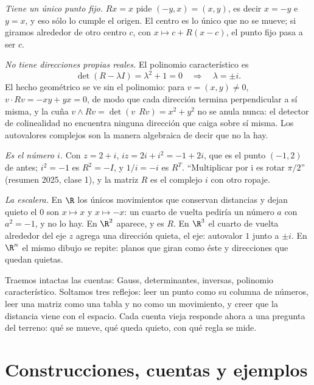 \emph{Tiene un único punto fijo.} \(Rx=x\) pide \((-y,x)=(x,y)\), es decir \(x=-y\) e
\(y=x\), y eso sólo lo cumple el origen. El centro es lo único que no se mueve; si giramos
alrededor de otro centro \(c\), con \(x\mapsto c+R(x-c)\), el punto fijo pasa a ser \(c\).

\emph{No tiene direcciones propias reales.} El polinomio característico es
\[
  \det(R-\lambda I)=\lambda^2+1=0\quad\Longrightarrow\quad\lambda=\pm i .
\]
El hecho geométrico se ve sin el polinomio: para \(v=(x,y)\neq0\), \(v\cdot Rv=-xy+yx=0\),
de modo que cada dirección termina perpendicular a sí misma, y la cuña
\(v\wedge Rv=\det(v\ \ Rv)=x^2+y^2\) no se anula nunca: el detector de colinealidad no
encuentra ninguna dirección que caiga sobre sí misma. Los autovalores complejos son la
manera algebraica de decir que no la hay.

\emph{Es el número \(i\).} Con \(z=2+i\), \(iz=2i+i^2=-1+2i\), que es el punto \((-1,2)\) de
antes; \(i^2=-1\) es \(R^2=-I\), y \(1/i=-i\) es \(R^T\). ``Multiplicar por i es rotar
\(\pi/2\)'' (resumen 2025, clase 1), y la matriz \(R\) es el complejo \(i\) con otro ropaje.

\emph{La escalera.} En \(\R\) los únicos movimientos que conservan distancias y dejan quieto
el \(0\) son \(x\mapsto x\) y \(x\mapsto-x\): un cuarto de vuelta pediría un número \(a\)
con \(a^2=-1\), y no lo hay. En \(\R^2\) aparece, y es \(R\). En \(\R^3\) el cuarto de vuelta
alrededor del eje \(z\) agrega una dirección quieta, el eje: autovalor \(1\) junto a
\(\pm i\). En \(\R^n\) el mismo dibujo se repite: planos que giran como éste y direcciones
que quedan quietas.

\begin{idea}
Traemos intactas las cuentas: Gauss, determinantes, inversas, polinomio característico.
Soltamos tres reflejos: leer un punto como su columna de números, leer una matriz como una
tabla y no como un movimiento, y creer que la distancia viene con el espacio. Cada cuenta
vieja responde ahora a una pregunta del terreno: qué se mueve, qué queda quieto, con qué
regla se mide.
\end{idea}

{\small\vspace{1mm}\par}

\section{Construcciones, cuentas y ejemplos}

